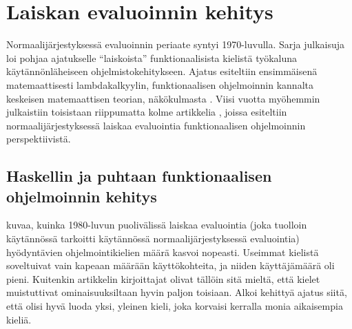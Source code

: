 
\section{Laiskan evaluoinnin kehitys \label{historia}}

Normaalijärjestyksessä evaluoinnin periaate syntyi 1970-luvulla. Sarja julkaisuja loi pohjaa ajatukselle ``laiskoista'' funktionaalisista kielistä työkaluna käytännönläheiseen ohjelmistokehitykseen. Ajatus esiteltiin ensimmäisenä matemaattisesti lambdakalkyylin, funktionaalisen ohjelmoinnin kannalta keskeisen matemaattisen teorian, näkökulmasta \citep{wadsworth1971semantics}. Viisi vuotta myöhemmin julkaistiin toisistaan riippumatta kolme artikkelia \citep{henderson1976lazy,friedman1976cuns,saslmanualturner}, joissa esiteltiin normaalijärjestyksessä laiskaa evaluointia  funktionaalisen ohjelmoinnin perspektiivistä.

\subsection{Haskellin ja puhtaan funktionaalisen ohjelmoinnin kehitys}

\citet{hudak2007history} kuvaa, kuinka 1980-luvun puolivälissä laiskaa evaluointia (joka tuolloin käytännössä tarkoitti käytännössä normaalijärjestyksessä evaluointia) hyödyntävien ohjelmointikielien määrä kasvoi nopeasti. Useimmat kielistä soveltuivat vain kapeaan määrään käyttökohteita, ja niiden käyttäjämäärä oli pieni. Kuitenkin artikkelin kirjoittajat olivat tällöin sitä mieltä, että kielet muistuttivat ominaisuuksiltaan hyvin paljon toisiaan. Alkoi kehittyä ajatus siitä, että olisi hyvä luoda yksi, yleinen kieli, joka korvaisi kerralla monia aikaisempia kieliä.

